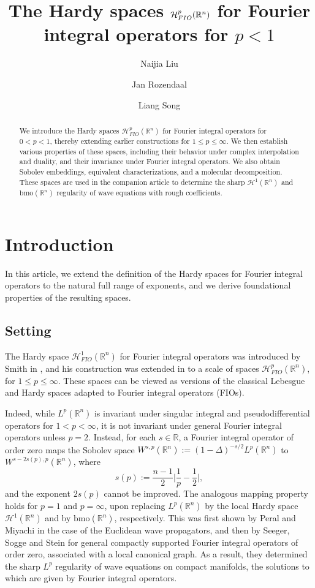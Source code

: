 \documentclass{amsart}
\title[The Hardy spaces $\Hp$ for FIOs for $p<1$]{The Hardy spaces $\Hp$ for Fourier integral operators for $p<1$}
\author{Naijia Liu}
\author{Jan Rozendaal}
\author{Liang Song}
\newcommand {\bmo}{\mathrm{bmo}}
\newcommand {\HT}{\mathcal{H}}
\newcommand {\Hp}{\mathcal{H}^{p}_{FIO}(\Rn)}
\newcommand {\R}{\mathbb R}
\newcommand {\Rn}{\mathbb{R}^{n}}
\theoremstyle{definition}
\numberwithin{equation}{section}
\begin{document}
	
	

\begin{abstract}
We introduce the Hardy spaces $\Hp$ for Fourier integral operators for $0<p<1$, thereby extending earlier constructions for $1\leq p\leq \infty$. We then establish various properties of these spaces, including their behavior under complex interpolation and duality, and their invariance under Fourier integral operators. We also obtain Sobolev embeddings, equivalent characterizations, and a molecular decomposition. These spaces are used in the companion article \cite{LiRoSo25a} to determine the sharp $\HT^{1}(\Rn)$ and $\bmo(\Rn)$ regularity of wave equations with rough coefficients.
\end{abstract}
	
\maketitle	






\section{Introduction}\label{sec:intro}	

In this article, we extend the definition of the Hardy spaces for Fourier integral operators to the natural full range of exponents, and we derive foundational properties of the resulting spaces.


\subsection{Setting}

The Hardy space $\HT^{1}_{FIO}(\Rn)$ for Fourier integral operators was introduced by Smith in \cite{Smith98a}, and his construction was extended in \cite{HaPoRo20} to a scale of spaces $\Hp$, for $1\leq p\leq \infty$. These spaces can be viewed as versions of the classical Lebesgue and Hardy spaces adapted to Fourier integral operators (FIOs).

Indeed, while $L^{p}(\Rn)$ is invariant under singular integral and pseudodifferential operators for $1<p<\infty$, it is not invariant under general Fourier integral operators unless $p=2$. Instead, for each $s\in\R$, a Fourier integral operator of order zero maps the Sobolev space $W^{s,p}(\Rn):=(1-\Delta)^{-s/2}L^{p}(\Rn)$ to $W^{s-2s(p),p}(\Rn)$, where 
\[
s(p):=\frac{n-1}{2}\Big|\frac{1}{p}-\frac{1}{2}\Big|,
\]
and the exponent $2s(p)$ cannot be improved. The analogous mapping property holds for $p=1$ and $p=\infty$, upon replacing $L^{p}(\Rn)$ by the local Hardy space $\HT^{1}(\Rn)$ and by $\bmo(\Rn)$, respectively. This was first shown by Peral \cite{Peral80} and Miyachi \cite{Miyachi80a} in the case of the Euclidean wave propagators, and then by Seeger, Sogge and Stein \cite{SeSoSt91} for general compactly supported Fourier integral operators of order zero, associated with a local canonical graph. As a result, they determined the sharp $L^{p}$ regularity of wave equations on compact manifolds, the solutions to which are given by Fourier integral operators.
\end{document}
